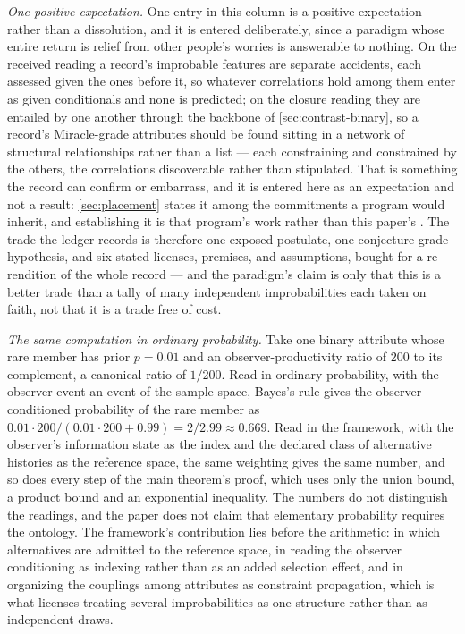 \documentclass[11pt]{article}
\theoremstyle{definition}
\begin{document}
\textit{One positive expectation.} One entry in this column is a positive expectation rather than a dissolution, and it is entered deliberately, since a paradigm whose entire return is relief from other people's worries is answerable to nothing. On the received reading a record's improbable features are separate accidents, each assessed given the ones before it, so whatever correlations hold among them enter as given conditionals and none is predicted; on the closure reading they are entailed by one another through the backbone of \autoref{sec:contrast-binary}, so a record's Miracle-grade attributes should be found sitting in a network of structural relationships rather than a list --- each constraining and constrained by the others, the correlations discoverable rather than stipulated. That is something the record can confirm or embarrass, and it is entered here as an expectation and not a result: \autoref{sec:placement} states it among the commitments a program would inherit, and establishing it is that program's work rather than this paper's \cite{Nexus}. The trade the ledger records is therefore one exposed postulate, one conjecture-grade hypothesis, and six stated licenses, premises, and assumptions, bought for a re-rendition of the whole record --- and the paradigm's claim is only that this is a better trade than a tally of many independent improbabilities each taken on faith, not that it is a trade free of cost.


\noindent\textit{The same computation in ordinary probability.} Take one binary attribute whose rare member has prior $p = 0.01$ and an observer-productivity ratio of $200$ to its complement, a canonical ratio of $1/200$. Read in ordinary probability, with the observer event an event of the sample space, Bayes's rule gives the observer-conditioned probability of the rare member as $0.01 \cdot 200 / (0.01 \cdot 200 + 0.99) = 2/2.99 \approx 0.669$. Read in the framework, with the observer's information state as the index and the declared class of alternative histories as the reference space, the same weighting gives the same number, and so does every step of the main theorem's proof, which uses only the union bound, a product bound and an exponential inequality. The numbers do not distinguish the readings, and the paper does not claim that elementary probability requires the ontology. The framework's contribution lies before the arithmetic: in which alternatives are admitted to the reference space, in reading the observer conditioning as indexing rather than as an added selection effect, and in organizing the couplings among attributes as constraint propagation, which is what licenses treating several improbabilities as one structure rather than as independent draws.
\end{document}
